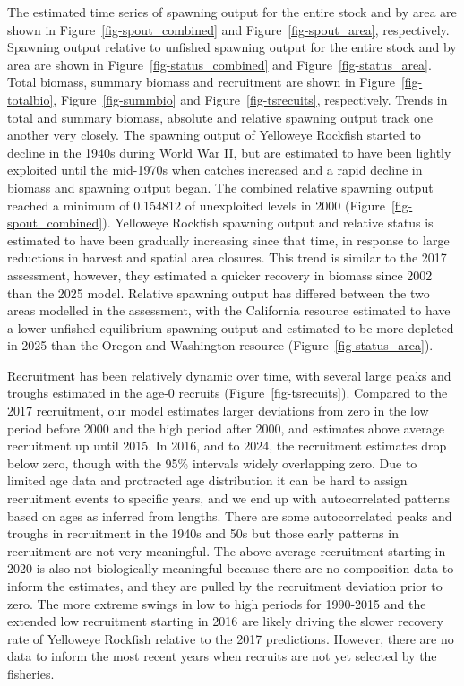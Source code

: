 \documentclass[
]{scrartcl}
\begin{document}
The estimated time series of spawning output for the entire stock and by
area are shown in Figure~\ref{fig-spout_combined} and
Figure~\ref{fig-spout_area}, respectively. Spawning output relative to
unfished spawning output for the entire stock and by area are shown in
Figure~\ref{fig-status_combined} and Figure~\ref{fig-status_area}. Total
biomass, summary biomass and recruitment are shown in
Figure~\ref{fig-totalbio}, Figure~\ref{fig-summbio} and
Figure~\ref{fig-tsrecuits}, respectively. Trends in total and summary
biomass, absolute and relative spawning output track one another very
closely. The spawning output of Yelloweye Rockfish started to decline in
the 1940s during World War II, but are estimated to have been lightly
exploited until the mid-1970s when catches increased and a rapid decline
in biomass and spawning output began. The combined relative spawning
output reached a minimum of 0.154812 of unexploited levels in 2000
(Figure~\ref{fig-spout_combined}). Yelloweye Rockfish spawning output
and relative status is estimated to have been gradually increasing since
that time, in response to large reductions in harvest and spatial area
closures. This trend is similar to the 2017 assessment, however, they
estimated a quicker recovery in biomass since 2002 than the 2025 model.
Relative spawning output has differed between the two areas modelled in
the assessment, with the California resource estimated to have a lower
unfished equilibrium spawning output and estimated to be more depleted
in 2025 than the Oregon and Washington resource
(Figure~\ref{fig-status_area}).

Recruitment has been relatively dynamic over time, with several large
peaks and troughs estimated in the age-0 recruits
(Figure~\ref{fig-tsrecuits}). Compared to the 2017 recruitment, our
model estimates larger deviations from zero in the low period before
2000 and the high period after 2000, and estimates above average
recruitment up until 2015. In 2016, and to 2024, the recruitment
estimates drop below zero, though with the 95\% intervals widely
overlapping zero. Due to limited age data and protracted age
distribution it can be hard to assign recruitment events to specific
years, and we end up with autocorrelated patterns based on ages as
inferred from lengths. There are some autocorrelated peaks and troughs
in recruitment in the 1940s and 50s but those early patterns in
recruitment are not very meaningful. The above average recruitment
starting in 2020 is also not biologically meaningful because there are
no composition data to inform the estimates, and they are pulled by the
recruitment deviation prior to zero. The more extreme swings in low to
high periods for 1990-2015 and the extended low recruitment starting in
2016 are likely driving the slower recovery rate of Yelloweye Rockfish
relative to the 2017 predictions. However, there are no data to inform
the most recent years when recruits are not yet selected by the
fisheries.
\end{document}
